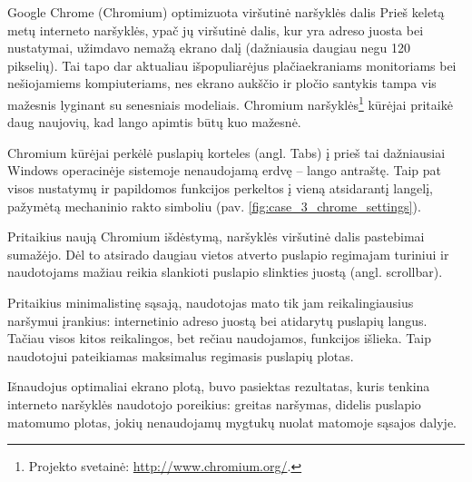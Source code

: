 \begin{xcase}{Google Chrome (Chromium) optimizuota viršutinė naršyklės dalis}
  \xcgoal
  {
    Prieš keletą metų interneto naršyklės, ypač jų viršutinė
    dalis, kur yra adreso juosta bei nustatymai, užimdavo nemažą
    ekrano dalį (dažniausia daugiau negu 120 pikselių). Tai tapo dar
    aktualiau išpopuliarėjus  plačiaekraniams monitoriams bei
    nešiojamiems kompiuteriams, nes ekrano aukščio ir pločio
    santykis tampa vis mažesnis lyginant su senesniais modeliais.
    Chromium naršyklės\footnote{Projekto svetainė:
    \url{http://www.chromium.org/}.} kūrėjai pritaikė  daug
    naujovių, kad lango apimtis būtų kuo mažesnė.
  }
  
  \xctools
  {
    Chromium kūrėjai perkėlė puslapių korteles (angl. Tabs) į
    prieš tai dažniausiai Windows operacinėje sistemoje nenaudojamą
    erdvę – lango antraštę. Taip pat visos nustatymų ir papildomos
    funkcijos perkeltos į vieną atsidarantį langelį, pažymėtą
    mechaninio rakto simboliu (pav. \ref{fig:case_3_chrome_settings}).
	
    {
    }
  }
  
  \xcresult
  {
    Pritaikius naują Chromium išdėstymą, naršyklės viršutinė dalis
    pastebimai sumažėjo. Dėl to atsirado daugiau vietos atverto puslapio
    regimajam turiniui ir naudotojams mažiau reikia slankioti puslapio
    slinkties juostą (angl. scrollbar).
  }
  
  \xcprinciples
  {
    {
      Pritaikius minimalistinę sąsają, naudotojas mato tik jam
      reikalingiausius naršymui įrankius: internetinio adreso juostą
      bei atidarytų puslapių langus. Tačiau visos kitos reikalingos,
      bet rečiau naudojamos, funkcijos išlieka. Taip naudotojui
      pateikiamas maksimalus regimasis puslapių  plotas.
    }
  }
  
  \xcthoughts
  {
    Išnaudojus optimaliai ekrano plotą, buvo pasiektas rezultatas,
    kuris tenkina interneto naršyklės naudotojo poreikius: greitas
    naršymas, didelis puslapio matomumo plotas, jokių nenaudojamų
    mygtukų nuolat matomoje sąsajos dalyje.
  }
\end{xcase}
